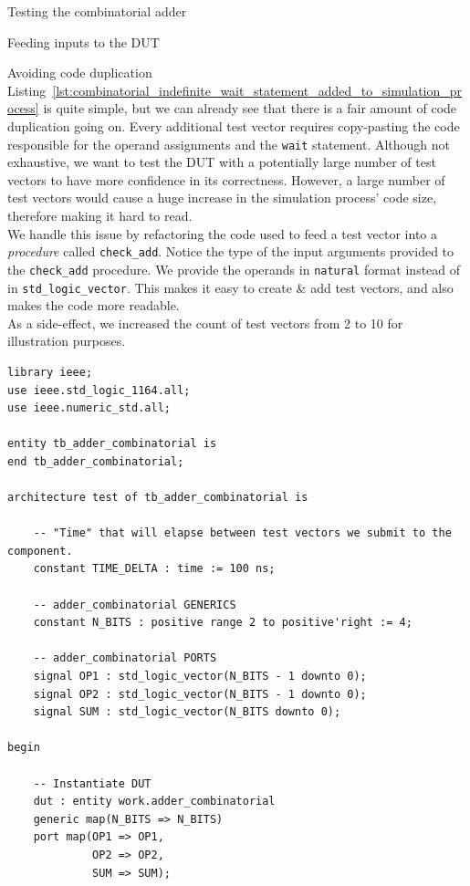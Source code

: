 \documentclass[lab]{course}
\begin{document}
\begin{section}{Testing the combinatorial adder}
\begin{subsection}{Feeding inputs to the DUT}
        \clearpage

        \begin{subsubsection}{Avoiding code duplication}
            Listing~\ref{lst:combinatorial_indefinite_wait_statement_added_to_simulation_process} is quite simple, but we can already see that there is a fair amount of code duplication going on. Every additional test vector requires copy-pasting the code responsible for the operand assignments and the \verb+wait+ statement. Although not exhaustive, we want to test the DUT with a potentially large number of test vectors to have more confidence in its correctness. However, a large number of test vectors would cause a huge increase in the simulation process' code size, therefore making it hard to read. \\

            We handle this issue by refactoring the code used to feed a test vector into a \emph{procedure} called \verb+check_add+. Notice the type of the input arguments provided to the \verb+check_add+ procedure. We provide the operands in \verb+natural+ format instead of in \verb+std_logic_vector+. This makes it easy to create \& add test vectors, and also makes the code more readable. \\

            As a side-effect, we increased the count of test vectors from 2 to 10 for illustration purposes.

            \begin{lstlisting}[caption={Refactored test vector feeding code into a \emph{procedure} called \texttt{check\_add}}, label={lst:combinatorial_refactored_test_vector_feeding_code}]
library ieee;
use ieee.std_logic_1164.all;
use ieee.numeric_std.all;

entity tb_adder_combinatorial is
end tb_adder_combinatorial;

architecture test of tb_adder_combinatorial is

    -- "Time" that will elapse between test vectors we submit to the component.
    constant TIME_DELTA : time := 100 ns;

    -- adder_combinatorial GENERICS
    constant N_BITS : positive range 2 to positive'right := 4;

    -- adder_combinatorial PORTS
    signal OP1 : std_logic_vector(N_BITS - 1 downto 0);
    signal OP2 : std_logic_vector(N_BITS - 1 downto 0);
    signal SUM : std_logic_vector(N_BITS downto 0);

begin

    -- Instantiate DUT
    dut : entity work.adder_combinatorial
    generic map(N_BITS => N_BITS)
    port map(OP1 => OP1,
             OP2 => OP2,
             SUM => SUM);


\end{lstlisting}
\end{subsubsection}
\end{subsection}
\end{section}
\end{document}
